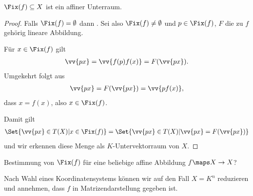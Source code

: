 \begin{lemma}\label{affine_fixpunkte_sind_affiner_unterraum}
    \( \Fix(f)\subseteq X \) ist ein affiner Unterraum.
\end{lemma}
\begin{proof}
    Falls \( \Fix(f)=\emptyset \) dann \checkmark. Sei also \( \Fix(f)\neq \emptyset \) und \( p\in \Fix(f) \), \( F \) die zu \( f \) gehörig lineare Abbildung.

    Für \( x\in \Fix(f) \) gilt
    \begin{align*}
        \vv{px}=\vv{f(p) f(x)}=F(\vv{px}).
    \end{align*}
    Umgekehrt folgt aus
    \begin{align*}
        \vv{px}=F(\vv{px})=\vv{p f(x)},
    \end{align*}
    dass \( x=f(x) \), also \( x\in \Fix(f) \).

    Damit gilt
    \begin{align*}
        \Set{\vv{px}\in T(X)|x\in \Fix(f)}=\Set{\vv{px}\in T(X)|\vv{px}=F(\vv{px})}
    \end{align*}
    und wir erkennen diese Menge als \( K \)-Untervektorraum von \( X \).
\end{proof}
\begin{frage*}
    Bestimmung von \( \Fix(f) \) für eine beliebige affine Abbildung \( f\maps X\to X \)?
\end{frage*}
Nach Wahl eines Koordinatensystems können wir auf den Fall \( X=K^n \) reduzieren und annehmen, dass \( f \) in Matrizendarstellung gegeben ist.

